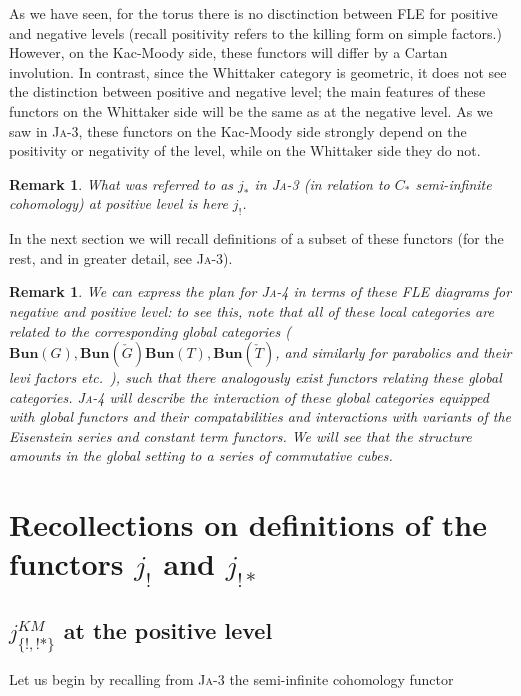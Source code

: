 \documentclass[12pt]{amsart}
\newtheorem{rmk}[thm]{Remark}
\newcommand\Ja[1]{\textsc{Ja}-#1}
\newcommand\Bun{\mathbf{Bun}}
\begin{document}
  As we have seen, for the torus there is no disctinction between FLE for
  positive and negative levels (recall positivity refers to the killing form on
  simple factors.) However, on the Kac-Moody side, these functors will differ by
  a Cartan involution. In contrast, since the Whittaker category is geometric,
  it does not see the distinction between positive and negative level; the main
  features of these functors on the Whittaker side will be the same as at the
  negative level. As we saw in \Ja{3}, these functors on the Kac-Moody
  side strongly depend on the positivity or negativity of the level, while on
  the Whittaker side they do not.\\

  \begin{rmk}
    What was referred to as $j_*$ in \Ja{3} (in relation to $C_*$ semi-infinite
    cohomology) at positive level is here $j_!$.
  \end{rmk}

  In the next section we will recall definitions of a subset of these functors
  (for the rest, and in greater detail, see \Ja{3}).

  \begin{rmk}
    We can express the plan for \Ja{4} in terms of these FLE diagrams for
    negative and positive level: to see this, note that all of these local
    categories are related to the corresponding global categories
    ($\Bun(G),\Bun(\check{G}) \Bun(T),\Bun(\check{T})$, and similarly for
    parabolics and their levi factors etc.\ ), such that there analogously
    exist functors relating these global categories. \Ja{4} will describe the
    interaction of these global categories equipped with global functors and
    their compatabilities and interactions with variants of the Eisenstein
    series and constant term functors. We will see that the structure amounts
    in the global setting to a series of commutative cubes.
  \end{rmk}

\section{Recollections on definitions of the functors $j_!$ and $j_{!*}$}
\subsection{$j_{\{!,!*\}}^{KM}$ at the positive level}
Let us begin by recalling from \Ja{3} the
semi-infinite cohomology functor
\end{document}

